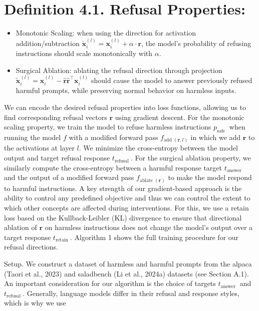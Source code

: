 \documentclass[10pt]{article}
\begin{document}
\section*{Definition 4.1. Refusal Properties:}
\begin{itemize}
  \item Monotonic Scaling: when using the direction for activation addition/subtraction $\check{\boldsymbol{x}}_{i}^{(l)}=\boldsymbol{x}_{i}^{(l)}+\alpha \cdot \boldsymbol{r}$, the model's probability of refusing instructions should scale monotonically with $\alpha$.
  \item Surgical Ablation: ablating the refusal direction through projection $\tilde{\boldsymbol{x}}_{i}^{(l)}=\boldsymbol{x}_{i}^{(l)}-\hat{\boldsymbol{r}} \hat{\boldsymbol{r}}^{\top} \boldsymbol{x}_{i}^{(l)}$ should cause the model to answer previously refused harmful prompts, while preserving normal behavior on harmless inputs.
\end{itemize}

We can encode the desired refusal properties into loss functions, allowing us to find corresponding refusal vectors $\boldsymbol{r}$ using gradient descent. For the monotonic scaling property, we train the model to refuse harmless instructions $p_{\text {safe }}$ when running the model $f$ with a modified forward pass $f_{\text {add }(\boldsymbol{r}, l)}$ in which we add $\boldsymbol{r}$ to the activations at layer $l$. We minimize the cross-entropy between the model output and target refusal response $t_{\text {refusal }}$. For the surgical ablation property, we similarly compute the cross-entropy between a harmful response target $t_{\text {answer }}$ and the output of a modified forward pass $f_{\text {ablate }(\boldsymbol{r})}$ to make the model respond to harmful instructions. A key strength of our gradient-based approach is the ability to control any predefined objective and thus we can control the extent to which other concepts are affected during interventions. For this, we use a retain loss based on the Kullback-Leibler (KL) divergence to ensure that directional ablation of $\boldsymbol{r}$ on harmless instructions does not change the model's output over a target response $t_{\text {retain }}$. Algorithm 1 shows the full training procedure for our refusal directions.

Setup. We construct a dataset of harmless and harmful prompts from the alpaca (Taori et al., 2023) and saladbench (Li et al., 2024a) datasets (see Section A.1). An important consideration for our algorithm is the choice of targets $t_{\text {answer }}$ and $t_{\text {refusal }}$. Generally, language models differ in their refusal and response styles, which is why we use
\end{document}
